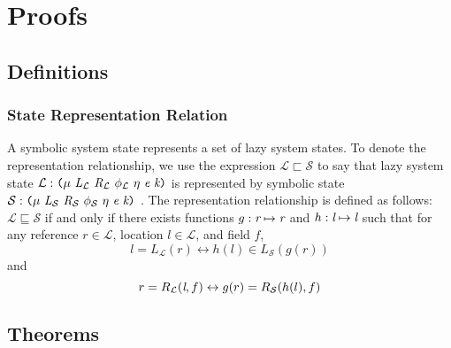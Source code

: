 \section{Proofs}

\subsection{Definitions}

\subsubsection{State Representation Relation}
A symbolic system state represents a set of lazy system states. To denote the representation relationship, we use the expression $\mathcal{L}\sqsubset \mathcal{S} $ to say that lazy system state $\mathcal{L}:\lp \mu\ \cfgnt{L}_{\mathcal{L}}\ \cfgnt{R}_{\mathcal{L}}\ \phi_{\mathcal{L}}\ \eta\ \cfgnt{e}\ \cfgnt{k}\rp$ is represented by symbolic state $\mathcal{S}:\lp \mu\ \cfgnt{L}_{\mathcal{S}}\ \cfgnt{R}_{\mathcal{S}}\ \phi_{\mathcal{S}}\ \eta\ \cfgnt{e}\ \cfgnt{k}\rp$ . The representation relationship is defined as follows: $\mathcal{L}\sqsubseteq \mathcal{S} $ if and only if there exists functions $g:\emph{r} \mapsto \emph{r}$ and $h:\emph{l} \mapsto \emph{l}$ such that for any reference $r \in \mathcal{L}$, location $l \in \mathcal{L}$, and field $f$, $$ l = L_{\mathcal{L}}(r) \leftrightarrow h(l)\in L_{\mathcal{S}}(g(r))$$ and $$ r = R_{\mathcal{L}}(\emph{l},f) \leftrightarrow g(r) = R_{\mathcal{S}}(h(l),f)$$

\subsection{Theorems}